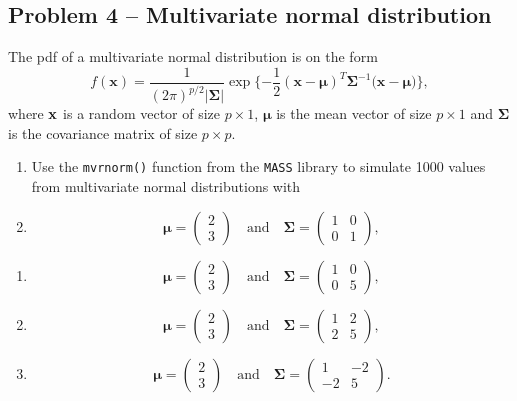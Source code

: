 \documentclass[
]{article}
\begin{document}
\subsection{Problem 4 -- Multivariate normal
distribution}\label{problem-4-multivariate-normal-distribution}

The pdf of a multivariate normal distribution is on the form
\[ f(\boldsymbol{x}) = \frac{1}{(2\pi)^{p/2}|\boldsymbol{\Sigma|}} \exp\{-\frac{1}{2}(\boldsymbol{x-\mu})^T\boldsymbol{\Sigma}^{-1}(\boldsymbol{x-\mu)}\},\]
where \(\bf{x}\) is a random vector of size \(p\times 1\),
\(\boldsymbol{\mu}\) is the mean vector of size \(p\times 1\) and
\(\boldsymbol{\Sigma}\) is the covariance matrix of size \(p\times p\).

\begin{enumerate}
\def\labelenumi{\alph{enumi})}
\item
  Use the \texttt{mvrnorm()} function from the \texttt{MASS} library to
  simulate 1000 values from multivariate normal distributions with
\item
  \[ \boldsymbol{\mu} = \begin{pmatrix}
  2 \\
  3 
  \end{pmatrix} \quad \text{and} \quad \boldsymbol{\Sigma} = \begin{pmatrix}
  1 & 0\\
  0 & 1
  \end{pmatrix},\]
\end{enumerate}

\begin{enumerate}
\def\labelenumi{\roman{enumi})}
\setcounter{enumi}{1}
\item
  \[ \boldsymbol{\mu} = \begin{pmatrix}
  2 \\
  3 
  \end{pmatrix} \quad \text{and} \quad \boldsymbol{\Sigma} = \begin{pmatrix}
  1 & 0\\
  0 & 5
  \end{pmatrix},\]
\item
  \[ \boldsymbol{\mu} = \begin{pmatrix}
  2 \\
  3 
  \end{pmatrix} \quad \text{and} \quad \boldsymbol{\Sigma} = \begin{pmatrix}
  1 & 2\\
  2 & 5
  \end{pmatrix},\]
\item
  \[ \boldsymbol{\mu} = \begin{pmatrix}
  2 \\
  3 
  \end{pmatrix} \quad \text{and} \quad \boldsymbol{\Sigma} = \begin{pmatrix}
  1 & -2\\
  -2 & 5
  \end{pmatrix}.\]
\end{enumerate}
\end{document}

